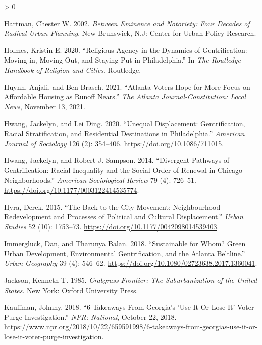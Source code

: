 \documentclass[
  12pt,
]{article}
\newlength{\cslhangindent}
\newenvironment{CSLReferences}[2] %
 {%
  \setlength{\parindent}{0pt}
  \ifodd #1 \everypar{\setlength{\hangindent}{\cslhangindent}}\ignorespaces\fi
  \ifnum #2 > 0
  \setlength{\parskip}{#2\baselineskip}
  \fi
 }%
 {}
\begin{document}
\begin{CSLReferences}{1}{0}
\leavevmode\hypertarget{ref-Hartman2002}{}%
Hartman, Chester W. 2002. \emph{Between Eminence and Notoriety: Four Decades of Radical Urban Planning}. {New Brunswick, N.J}: {Center for Urban Policy Research}.

\leavevmode\hypertarget{ref-Holmes2020}{}%
Holmes, Kristin E. 2020. {``Religious Agency in the Dynamics of Gentrification: {Moving} in, Moving Out, and Staying Put in {Philadelphia}.''} In \emph{The {Routledge Handbook} of {Religion} and {Cities}}. {Routledge}.

\leavevmode\hypertarget{ref-Huynh2021}{}%
Huynh, Anjali, and Ben Brasch. 2021. {``Atlanta Voters Hope for More Focus on Affordable Housing as Runoff Nears.''} \emph{The Atlanta Journal-Constitution: Local News}, November 13, 2021.

\leavevmode\hypertarget{ref-Hwang2020}{}%
Hwang, Jackelyn, and Lei Ding. 2020. {``Unequal {Displacement}: {Gentrification}, {Racial Stratification}, and {Residential Destinations} in {Philadelphia}.''} \emph{American Journal of Sociology} 126 (2): 354--406. \url{https://doi.org/10.1086/711015}.

\leavevmode\hypertarget{ref-Hwang2014}{}%
Hwang, Jackelyn, and Robert J. Sampson. 2014. {``Divergent {Pathways} of {Gentrification}: {Racial Inequality} and the {Social Order} of {Renewal} in {Chicago Neighborhoods}.''} \emph{American Sociological Review} 79 (4): 726--51. \url{https://doi.org/10.1177/0003122414535774}.

\leavevmode\hypertarget{ref-Hyra2015}{}%
Hyra, Derek. 2015. {``The Back-to-the-City Movement: {Neighbourhood} Redevelopment and Processes of Political and Cultural Displacement.''} \emph{Urban Studies} 52 (10): 1753--73. \url{https://doi.org/10.1177/0042098014539403}.

\leavevmode\hypertarget{ref-Immergluck2018}{}%
Immergluck, Dan, and Tharunya Balan. 2018. {``Sustainable for Whom? {Green} Urban Development, Environmental Gentrification, and the {Atlanta Beltline}.''} \emph{Urban Geography} 39 (4): 546--62. \url{https://doi.org/10.1080/02723638.2017.1360041}.

\leavevmode\hypertarget{ref-Jackson1985}{}%
Jackson, Kenneth T. 1985. \emph{Crabgrass Frontier: The Suburbanization of the {United States}}. {New York}: {Oxford University Press}.

\leavevmode\hypertarget{ref-Kauffman2018}{}%
Kauffman, Johnny. 2018. {``6 {Takeaways From Georgia}'s '{Use It Or Lose It}' {Voter Purge Investigation}.''} \emph{NPR: National}, October 22, 2018. \url{https://www.npr.org/2018/10/22/659591998/6-takeaways-from-georgias-use-it-or-lose-it-voter-purge-investigation}.


\end{CSLReferences}
\end{document}
